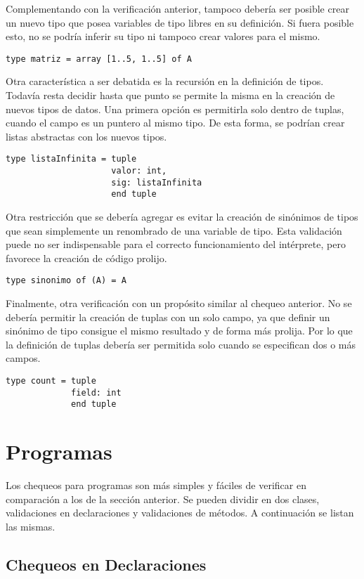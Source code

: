 \documentclass{article}
\begin{document}
Complementando con la verificación anterior, tampoco debería ser posible crear un nuevo tipo que posea variables de tipo libres en su definición.
Si fuera posible esto, no se podría inferir su tipo ni tampoco crear valores para el mismo.
\begin{lstlisting}
type matriz = array [1..5, 1..5] of A
\end{lstlisting}

Otra característica a ser debatida es la recursión en la definición de tipos.
Todavía resta decidir hasta que punto se permite la misma en la creación de nuevos tipos de datos.
Una primera opción es permitirla solo dentro de tuplas, cuando el campo es un puntero al mismo tipo.
De esta forma, se podrían crear listas abstractas con los nuevos tipos.
\begin{lstlisting}
type listaInfinita = tuple
                     valor: int,
                     sig: listaInfinita
                     end tuple
\end{lstlisting}

Otra restricción que se debería agregar es evitar la creación de sinónimos de tipos que sean simplemente un renombrado de una variable de tipo.
Esta validación puede no ser indispensable para el correcto funcionamiento del intérprete, pero favorece la creación de código prolijo.
\begin{lstlisting}
type sinonimo of (A) = A
\end{lstlisting}

Finalmente, otra verificación con un propósito similar al chequeo anterior.
No se debería permitir la creación de tuplas con un solo campo, ya que definir un sinónimo de tipo consigue el mismo resultado y de forma más prolija.
Por lo que la definición de tuplas debería ser permitida solo cuando se especifican dos o más campos.
\begin{lstlisting}
type count = tuple
             field: int
             end tuple
\end{lstlisting}

\section{Programas}

Los chequeos para programas son más simples y fáciles de verificar en comparación a los de la sección anterior.
Se pueden dividir en dos clases, validaciones en declaraciones y validaciones de métodos.
A continuación se listan las mismas.

\subsection{Chequeos en Declaraciones}
\end{document}
